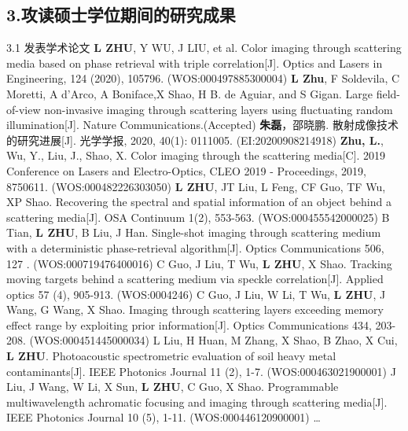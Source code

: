 \begin{resume}
\section*{3.\hspace{0.75em}攻读硕士学位期间的研究成果}
\begin{resumelist}{\hspace{-0.25em}3.1\hspace{0.5em} 发表学术论文}
\resumelistitem \textbf{L ZHU}, Y WU, J LIU, et al. Color imaging through scattering media based on phase retrieval with triple correlation[J]. Optics and Lasers in Engineering, 124 (2020), 105796. (WOS:000497885300004)
\resumelistitem \textbf{L Zhu}, F Soldevila, C Moretti, A d'Arco, A Boniface,X Shao, H B. de Aguiar, and S Gigan. Large field-of-view non-invasive imaging through scattering layers using fluctuating random illumination[J]. Nature Communications.(Accepted)
\resumelistitem \textbf{朱磊}，邵晓鹏. 散射成像技术的研究进展[J]. 光学学报, 2020, 40(1): 0111005. (EI:20200908214918)
\resumelistitem \textbf{Zhu, L.}, Wu, Y., Liu, J., Shao, X. Color imaging through the scattering media[C]. 2019 Conference on Lasers and Electro-Optics, CLEO 2019 - Proceedings, 2019, 8750611. (WOS:000482226303050)
\resumelistitem \textbf{L ZHU}, JT Liu, L Feng, CF Guo, TF Wu, XP Shao. Recovering the spectral and spatial information of an object behind a scattering media[J]. OSA Continuum 1(2), 553-563. (WOS:000455542000025)
\resumelistitem B Tian, \textbf{L ZHU}, B Liu, J Han. Single-shot imaging through scattering medium with a deterministic phase-retrieval algorithm[J]. Optics Communications 506, 127 . (WOS:000719476400016)
\resumelistitem C Guo, J Liu, T Wu, \textbf{L ZHU}, X Shao. Tracking moving targets behind a scattering medium via speckle correlation[J]. Applied optics 57 (4), 905-913. (WOS:0004246)
\resumelistitem C Guo, J Liu, W Li, T Wu, \textbf{L ZHU}, J Wang, G Wang, X Shao. Imaging through scattering layers exceeding memory effect range by exploiting prior information[J]. Optics Communications 434, 203-208. (WOS:000451445000034)
\resumelistitem L Liu, H Huan, M Zhang, X Shao, B Zhao, X Cui, \textbf{L ZHU}. Photoacoustic spectrometric evaluation of soil heavy metal contaminants[J]. IEEE Photonics Journal 11 (2), 1-7. (WOS:000463021900001)
\resumelistitem J Liu, J Wang, W Li, X Sun, \textbf{L ZHU}, C Guo, X Shao. Programmable multiwavelength achromatic focusing and imaging through scattering media[J]. IEEE Photonics Journal 10 (5), 1-11. (WOS:000446120900001)
\resumelistitem \ldots
\end{resumelist}


\end{resume}
